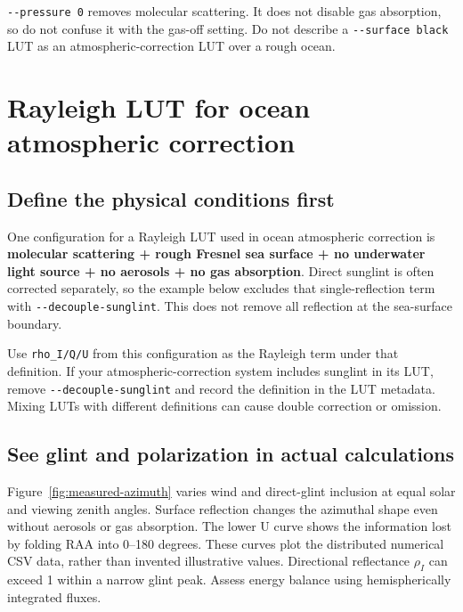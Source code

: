 \texttt{-\allowbreak{}-\allowbreak{}pressure 0} removes molecular scattering. It does not disable gas absorption, so do not confuse it with the gas-off setting. Do not describe a \texttt{-\allowbreak{}-\allowbreak{}surface black} LUT as an atmospheric-correction LUT over a rough ocean.

\section{Rayleigh LUT for ocean atmospheric correction}
\label{sec:auto:04_examples:3}
\subsection{Define the physical conditions first}
\label{sec:auto:04_examples:3.1}
One configuration for a Rayleigh LUT used in ocean atmospheric correction is \textbf{molecular scattering + rough Fresnel sea surface + no underwater light source + no aerosols + no gas absorption}. Direct sunglint is often corrected separately, so the example below excludes that single-reflection term with \texttt{-\allowbreak{}-\allowbreak{}decouple-\allowbreak{}sunglint}. This does not remove all reflection at the sea-surface boundary.

Use \texttt{rho\_\allowbreak{}I/\allowbreak{}Q/\allowbreak{}U} from this configuration as the Rayleigh term under that definition. If your atmospheric-correction system includes sunglint in its LUT, remove \texttt{-\allowbreak{}-\allowbreak{}decouple-\allowbreak{}sunglint} and record the definition in the LUT metadata. Mixing LUTs with different definitions can cause double correction or omission.

\subsection*{See glint and polarization in actual calculations}
Figure~\ref{fig:measured-azimuth} varies wind and direct-glint inclusion at equal solar and viewing zenith angles. Surface reflection changes the azimuthal shape even without aerosols or gas absorption. The lower U curve shows the information lost by folding RAA into 0--180 degrees. These curves plot the distributed numerical CSV data, rather than invented illustrative values. Directional reflectance $\rho_I$ can exceed 1 within a narrow glint peak. Assess energy balance using hemispherically integrated fluxes.

\FloatBarrier

